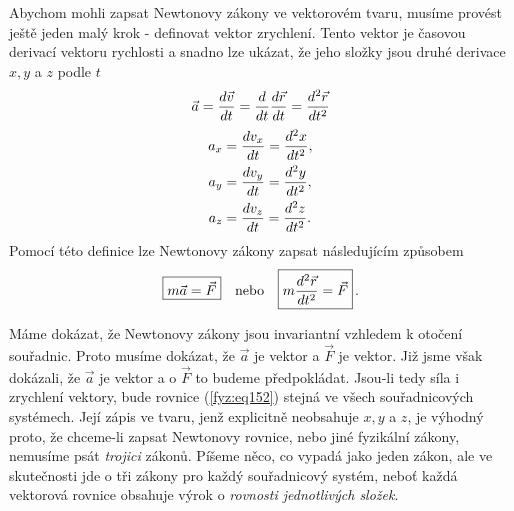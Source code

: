     Abychom mohli zapsat Newtonovy zákony ve vektorovém tvaru, musíme provést ještě jeden malý krok 
    - definovat vektor zrychlení. Tento vektor je časovou derivací vektoru rychlosti a snadno lze 
    ukázat, že jeho složky jsou druhé derivace \(x, y\) a \(z\) podle \(t\)
    \begin{equation}\label{fyz:eq150}
      \vec{a} = \dfrac{d \vec{v}}{d t} = \dfrac{d  }{d t}\dfrac{d \vec{r}}{d t} = \dfrac{d^2 \vec{r}}{d t^2}
    \end{equation}
    \begin{align*}                   %
      a_x &= \der{v_x}{t} = \dder{x}{t}, \\
      a_y &= \der{v_y}{t} = \dder{y}{t}, \\
      a_z &= \der{v_z}{t} = \dder{z}{t}.
    \end{align*}
     Pomocí této definice lze Newtonovy zákony zapsat následujícím způsobem
    \begin{equation}\label{fyz:eq152}
      \boxed{m\vec{a} = \vec{F}} \quad\text{nebo}\quad  \boxed{m\dfrac{d^2 \vec{r}}{d t^2} = \vec{F}}\,.
    \end{equation}
     
     Máme dokázat, že Newtonovy zákony jsou invariantní vzhledem k otočení souřadnic. Proto musíme 
     dokázat, že \(\vec{a}\) je vektor a \(\vec{F}\) je vektor. Již jsme však dokázali, že 
     \(\vec{a}\) je vektor a o \(\vec{F}\) to budeme předpokládat. Jsou-li tedy síla i zrychlení 
     vektory, bude rovnice (\ref{fyz:eq152}) stejná ve všech souřadnicových systémech. Její zápis 
     ve tvaru, jenž explicitně neobsahuje \(x, y\) a \(z\), je výhodný proto, že chceme-li zapsat 
     Newtonovy rovnice, nebo jiné fyzikální zákony, nemusíme psát \emph{trojici} zákonů. Píšeme 
     něco, co vypadá jako jeden zákon, ale ve skutečnosti jde o tři zákony pro každý souřadnicový 
     systém, neboť každá vektorová rovnice obsahuje výrok o \emph{rovnosti jednotlivých složek}. 
     
